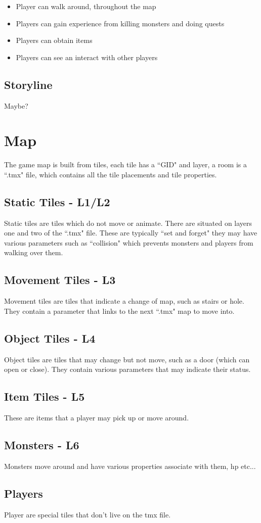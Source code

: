 \documentclass{article}
\begin{document}
\begin{itemize}
\item Player can walk around, throughout the map
\item Players can gain experience from killing monsters and doing quests
\item Players can obtain items
\item Players can see an interact with other players
\end{itemize}

\subsection{Storyline}
Maybe?

\section{Map}
The game map is built from tiles, each tile has a ``GID" and layer, a room is a ``.tmx" file, which contains all the tile placements and tile properties.  

\subsection{Static Tiles - L1/L2}
Static tiles are tiles which do not move or animate. There are situated on layers one 
and two of the ``.tmx" file. These are typically ``set and forget" they may have various parameters such as ``collision" which prevents monsters and players from walking over them.

\subsection{Movement Tiles - L3}
Movement tiles are tiles that indicate a change of map, such as stairs or hole. They contain a parameter that links to the next ``.tmx" map to move into.

\subsection{Object Tiles - L4}
Object tiles are tiles that may change but not move, such as a door (which can open or close). They contain various parameters that may indicate their status.

\subsection{Item Tiles - L5}
These are items that a player may pick up or move around.

\subsection{Monsters - L6}
Monsters move around and have various properties associate with them, hp etc...

\subsection{Players}
Player are special tiles that don't live on the tmx file.
\end{document}
